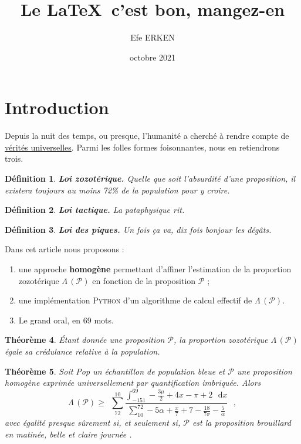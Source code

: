 \documentclass{article}
\newtheorem{definition}{Définition}
\newtheorem{theorem}[definition]{Théorème}
\begin{document}
	\author{Efe ERKEN}
	\date{octobre 2021}
	\title{Le \LaTeX\ c'est bon, mangez-en}
	\maketitle

	\section{Introduction}
	Depuis la nuit des temps, ou presque, l’humanité a cherché à rendre compte de \underline{vérités universelles}. Parmi les folles formes foisonnantes, nous en retiendrons trois.
	\label{sec:label1}

	\begin{definition}
	\textbf{Loi zozotérique.} Quelle que soit l’absurdité d’une proposition, il existera toujours au moins 72\% de la population pour y croire.
	\label{def:label1}
	\end{definition}

	\begin{definition}
	\textbf{Loi tactique.} La pataphysique rit.
	\label{def:label2}
	\end{definition}

	\begin{definition}
	\textbf{Loi des piques.} Un fois ça va, dix fois bonjour les dégâts.
	\label{def:label3}
	\end{definition}

	\noindent Dans cet article nous proposons :
	\begin{enumerate}
		\item une approche \textbf{homogène} permettant d’affiner l’estimation de la proportion zozotérique $\Lambda\,(\mathcal{P})$ en fonction de la proposition $\mathcal{P}$ ;
		\item une implémentation \textsc{Python} d’un algorithme de calcul effectif de $\Lambda\,(\mathcal{P})$.
		\item Le grand oral, en 69 mots.
	\end{enumerate}

	\begin{theorem}
		Étant donnée une proposition $\mathcal{P}$, la proportion zozotérique $\Lambda\,(\mathcal{P})$ égale sa crédulance relative à la population.
		\label{theo:label1}
	\end{theorem}

	\begin{theorem}
		Soit Pop un échantillon de population bleue et $\mathcal{P}$ une proposition homogène exprimée universellement par quantification imbriquée. Alors
		\[
		\Lambda\,(\mathcal{P}) \geqslant \, \; \sum_{72}^{10} \frac{\int_{-151}^{69} - \frac{3\mu}{2} + 4x - \pi + 2 \, \: \; \mathrm{d}x}{\sum_{10}^{72} - 5\alpha + \frac{x}{7} + 7 - \frac{18}{7\sigma} - \frac{5}{\alpha}} \, \: \;  \mathrm{,}
		\]
		avec égalité presque sûrement si, et seulement si, $\mathcal{P}$ est la proposition \og brouillard en matinée, belle et claire journée \fg.
		\label{theo:label2}
	\end{theorem}
\end{document}
